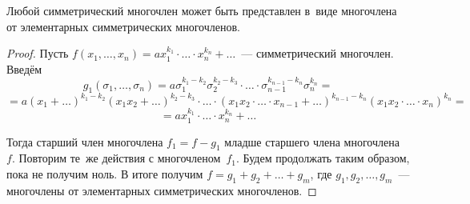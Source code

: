 \begin{theorem}
Любой симметрический многочлен может быть представлен в~виде многочлена от элементарных симметрических многочленов.
\end{theorem}
\begin{proof}
Пусть $f(x_1, \ldots, x_n) = a x_1^{k_1} \cdot \ldots \cdot x_n^{k_n} + \ldots$~--- симметрический многочлен. Введём
\begin{equation*}
g_1(\sigma_1, \ldots, \sigma_n) = a \sigma_1^{k_1 - k_2} \sigma_2^{k_2 - k_3} \cdot \ldots \cdot \sigma_{n-1}^{k_{n-1} - k_n} \sigma_n^{k_n} =
\end{equation*}
\begin{equation*}
= a(x_1 + \ldots)^{k_1 - k_2} (x_1 x_2 + \ldots)^{k_2 - k_3} \cdot \ldots \cdot (x_1 x_2 \cdot \ldots \cdot x_{n-1} + \ldots)^{k_{n-1} - k_n} (x_1 x_2 \cdot \ldots \cdot x_n)^{k_n} =
\end{equation*}
\begin{equation*}
= a x_1^{k_1} \cdot \ldots \cdot x_n^{k_n} + \ldots
\end{equation*}

Тогда старший член многочлена $f_1 = f - g_1$ младше старшего члена многочлена~$f$.
Повторим те~же действия с многочленом~$f_1$.
Будем продолжать таким образом, пока не получим ноль.
В итоге получим $f = g_1 + g_2 + \ldots + g_m$, где $g_1, g_2, \ldots, g_m$~--- многочлены от элементарных симметрических многочленов.
\end{proof}
